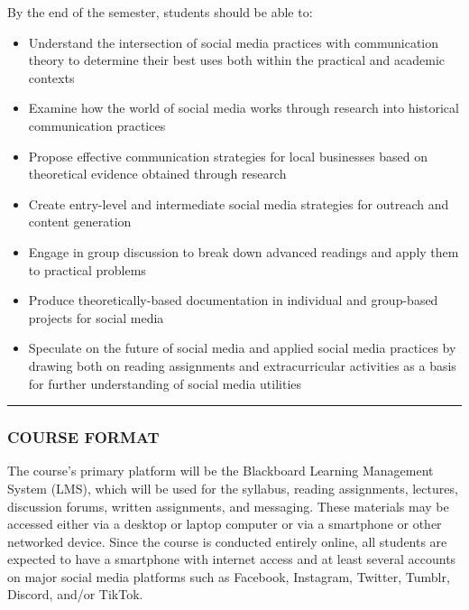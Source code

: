 \documentclass[]{tufte-handout}
\providecommand{\tightlist}{%
  \setlength{\itemsep}{0pt}\setlength{\parskip}{0pt}}
\begin{document}
By the end of the semester, students should be able to:

\begin{itemize}
\tightlist
\item
  Understand the intersection of social media practices with
  communication theory to determine their best uses both within the
  practical and academic contexts\\
\item
  Examine how the world of social media works through research into
  historical communication practices\\
\item
  Propose effective communication strategies for local businesses based
  on theoretical evidence obtained through research\\
\item
  Create entry-level and intermediate social media strategies for
  outreach and content generation\\
\item
  Engage in group discussion to break down advanced readings and apply
  them to practical problems\\
\item
  Produce theoretically-based documentation in individual and
  group-based projects for social media\\
\item
  Speculate on the future of social media and applied social media
  practices by drawing both on reading assignments and extracurricular
  activities as a basis for further understanding of social media
  utilities
\end{itemize}

\begin{center}\rule{0.5\linewidth}{0.5pt}\end{center}

\hypertarget{course-format}{%
\subsubsection{COURSE FORMAT}\label{course-format}}

The course's primary platform will be the Blackboard Learning Management
System (LMS), which will be used for the syllabus, reading assignments,
lectures, discussion forums, written assignments, and messaging. These
materials may be accessed either via a desktop or laptop computer or via
a smartphone or other networked device. Since the course is conducted
entirely online, all students are expected to have a smartphone with
internet access and at least several accounts on major social media
platforms such as Facebook, Instagram, Twitter, Tumblr, Discord, and/or
TikTok.
\end{document}
